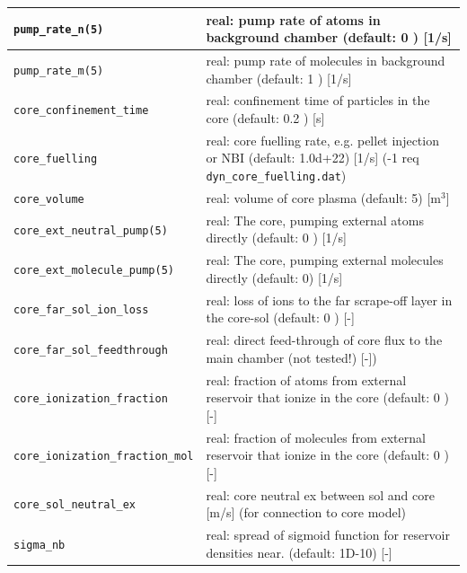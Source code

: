 \documentclass[amsmath,amssymb,a4]{revtex4-2}
\begin{document}
\begin{longtable}{| p{} | p{} |}
    {\tt  pump\_rate\_n(5) }            & real: pump rate of atoms in background chamber  (default: 0 ) [1/s]\\ \hline
    {\tt  pump\_rate\_m(5) }            & real:  pump rate of molecules in background chamber  (default: 1 ) [1/s]\\ \hline
    {\tt   core\_confinement\_time  }   & real: confinement time of particles in the core (default: 0.2 ) [s]\\ \hline    
    {\tt  core\_fuelling	}           &  real: core fuelling rate, e.g. pellet injection or NBI (default: 1.0d+22)  [1/s] (-1 req {\tt dyn\_core\_fuelling.dat}) \\ \hline 
    {\tt  core\_volume }                & real: volume of core plasma (default: 5) [m$^3$] \\ \hline 
    {\tt core\_ext\_neutral\_pump(5)  } & real: The core, pumping external atoms directly (default: 0 ) [1/s]\\ \hline
    {\tt core\_ext\_molecule\_pump(5) } & real: The core, pumping external molecules directly  (default: 0) [1/s]\\ \hline
    {\tt core\_far\_sol\_ion\_loss  }   & real: loss of ions to the far scrape-off layer in the core-sol   (default: 0 ) [-]\\ \hline 
    {\tt  core\_far\_sol\_feedthrough } & real: direct feed-through of core flux to the main chamber (not tested!) [-]) \\ \hline 
    {\tt core\_ionization\_fraction }   & real: fraction of atoms from external reservoir that ionize in the core (default: 0 ) [-]\\ \hline
    {\tt core\_ionization\_fraction\_mol} & real: fraction of molecules from external reservoir that ionize in the core (default: 0 ) [-]\\ \hline    
    {\tt core\_sol\_neutral\_ex}        & real: core neutral ex between sol and core [m/s] (for connection to core model)   \\ \hline  
    {\tt  sigma\_nb  }                  &  real: spread of sigmoid function for reservoir densities near. (default: 1D-10) [-]   \\ \hline    
    \end{longtable}
\cleardoublepage
\end{document}
